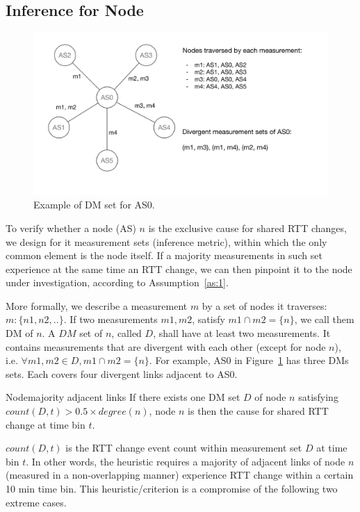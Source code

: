 \subsection{Inference for Node}
\begin{figure}[!htb]
\centering
\includegraphics[width=1\textwidth]{gfx/chap5/dms.pdf}
\caption{Example of \acf{DM} set for AS0.}
\label{fig:chap5_dms}
\end{figure}

To verify whether a node (AS) $n$ is the exclusive cause for shared RTT changes, we
design for it measurement sets (inference metric), within which the only common element is the node itself. If a majority measurements in such set experience at the same time an RTT change, we can then pinpoint it to the node under investigation, according to Assumption~\ref{as:1}.

More formally, we describe a measurement $m$ by a set of nodes it traverses: $m:\{n1, n2,..\}$. 
If two measurements $m1, m2$, satisfy $m1 \cap m2 = \{n\}$, we call them \acf{DM} of $n$.
A $DM$ set of $n$, called $D$, shall have at least two measurements. It contains measurements that are divergent with each other (except for node $n$), i.e. $\forall m1, m2 \in D, m1 \cap m2 = \{n\}$.
For example, AS0 in Figure~\ref{fig:chap5_dms} has three \acp{DM} sets. Each covers four divergent links adjacent to AS0.

\begin{heuristic}{Node}{majority adjacent links}\label{hu:node}
If there exists one \ac{DM} set $D$ of node $n$ satisfying $count(D, t) > 0.5 \times degree(n)$,  node $n$ is then the cause for shared RTT change at time bin $t$. 
\end{heuristic}

$count(D,t)$ is the RTT change event count within measurement set $D$ at time bin $t$. In other words, the heuristic requires a majority of adjacent links of node $n$ (measured in a non-overlapping manner) experience RTT change within a certain 10 min time bin. This heuristic/criterion is a compromise of the following two extreme cases.

